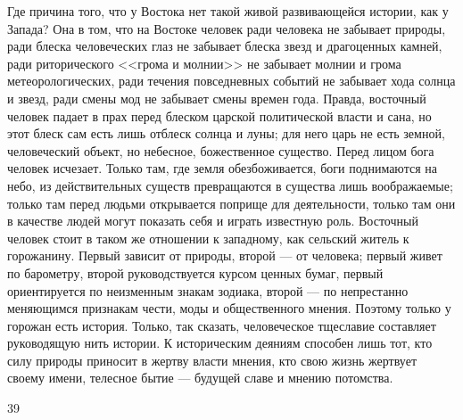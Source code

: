 \documentclass[12pt]{article}
\begin{document}
Где причина того, что у Востока нет такой живой развивающейся истории, как у Запада? Она в том, что на Востоке человек ради человека не забывает природы, ради блеска человеческих глаз не забывает блеска звезд и драгоценных камней, ради риторического <<грома и молнии>> не забывает молнии и грома метеорологических, ради течения повседневных событий не забывает хода солнца и звезд, ради смены мод не забывает смены времен года. Правда, восточный человек падает в прах перед блеском царской политической власти и сана, но этот блеск сам есть лишь отблеск солнца и луны; для него царь не есть земной, человеческий объект, но небесное, божественное существо. Перед лицом бога человек исчезает. Только там, где земля обезбоживается, боги поднимаются на небо, из действительных существ превращаются в существа лишь воображаемые; только там перед людьми открывается поприще для деятельности, только там они в качестве людей могут показать себя и играть известную роль. Восточный человек стоит в таком же отношении к западному, как сельский житель к горожанину. Первый зависит от природы, второй --- от человека; первый живет по барометру, второй руководствуется курсом ценных бумаг, первый ориентируется по неизменным знакам зодиака, второй --- по непрестанно меняющимся признакам чести, моды и общественного мнения. Поэтому только у горожан есть история. Только, так сказать, человеческое тщеславие составляет руководящую нить истории. К историческим деяниям способен лишь тот, кто силу природы приносит в жертву власти мнения, кто свою жизнь жертвует своему имени, телесное бытие --- будущей славе и мнению потомства.



39
\end{document}
